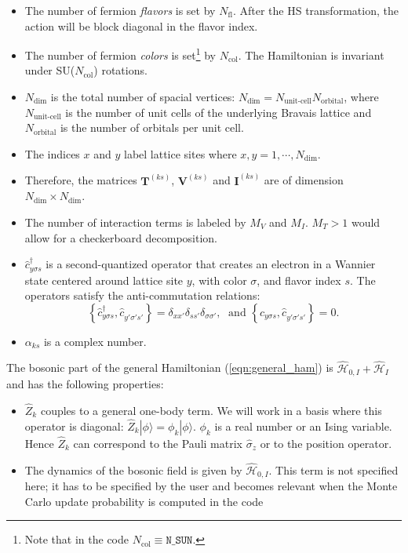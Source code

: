 \begin{itemize}
\item The number of fermion \emph{flavors} is set by $N_{\mathrm{fl}}$.  After the HS transformation, the action will be block diagonal in the flavor index. 
\item The number of fermion \emph{colors} is set\footnote{Note that  in the code $ N_{\mathrm{col}} \equiv \texttt{N\_{SUN}} $.} by $N_{\mathrm{col}}$.    The Hamiltonian is invariant under  SU($N_{\mathrm{col}}$)  rotations.
\item $N_{\mathrm{dim}}$ is the total number of spacial vertices: $N_{\mathrm{dim}}=N_{\text{unit-cell}} N_{\mathrm{orbital}}$, where $N_{\text{unit-cell}}$ is the number of unit cells of the underlying Bravais lattice and $N_{\mathrm{orbital}}$ is the number of  orbitals per unit cell.
\item The indices $x$ and $y$ label lattice sites where $x,y=1,\cdots, N_{\mathrm{dim}}$. 
\item Therefore, the  matrices $\bm{T}^{(k s)}$, $\bm{V}^{(ks)}$  and $\bm{I}^{(ks)}$ are  of dimension $N_{\mathrm{dim}}\times N_{\mathrm{dim}}$.
\item The number of interaction terms  is labeled by $M_V$   and $M_I$.   $M_T> 1 $ would allow for a checkerboard decomposition.
\item $\hat{c}^{\dagger}_{y \sigma s} $ is a second-quantized operator that creates an electron in a Wannier state centered around lattice site $y$, with color $\sigma$, and  flavor index $s$.  The operators satisfy the anti-commutation relations: 
\begin{equation}
	\left\{ \hat{c}^{\dagger}_{y \sigma s},    \hat{c}^{\phantom\dagger}_{y' \sigma' s'}  \right\}   =   \delta_{xx'}  \delta_{ss'} \delta_{\sigma\sigma'},   
	\; \text{ and } \left\{ \hat{c}^{\phantom\dagger}_{y \sigma s},    \hat{c}^{\phantom\dagger}_{y' \sigma' s'}  \right\}   =0.
\end{equation}
\item $\alpha_{k s}$ is a complex number.

\end{itemize}
The bosonic  part of the general Hamiltonian (\ref{eqn:general_ham}) is $\hat{\mathcal{H}}_{0,I}+ \hat{\mathcal{H}}_{I}$ and  has the following properties:
\begin{itemize}
\item $\hat{Z}_k$ couples to a general one-body term.  
We will work in a basis where this operator is diagonal:  $\hat{Z}_k | \phi \rangle  =  \phi_k | \phi \rangle $. $\phi_k$ is a real  number   or an  Ising variable. 
Hence   $\hat{Z}_k$ can correspond  to the Pauli matrix $\hat{\sigma}_{z}$ or to the position operator.  
\item  The dynamics of the bosonic field  is given by $\hat{\mathcal{H}}_{0,I}$. This term is not specified here; 
it has to be specified by the user and becomes relevant when the Monte Carlo update probability is computed in the code
\end{itemize}
